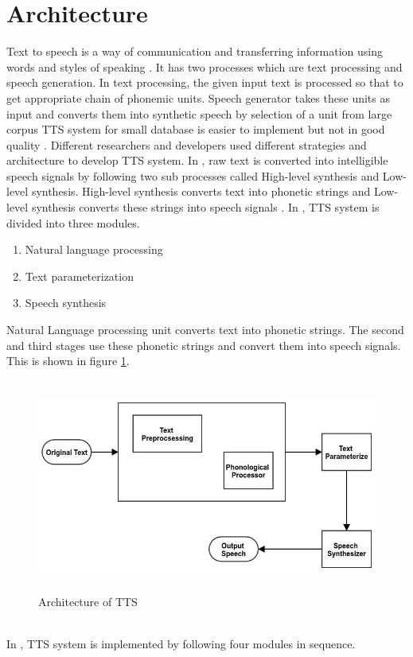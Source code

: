\section{Architecture}
Text to speech is a way of communication and transferring information using words and styles of
speaking \cite{eide2004corpus}. It has two processes which are text processing and speech
generation. In text processing, the given input text is processed so that to get appropriate chain of
phonemic units. Speech generator takes these units as input and converts them into synthetic
speech by selection of a unit from large corpus TTS system for small database is easier to
implement but not in good quality \cite{black2007statistical, zen2007hmm, raj2007text}.
Different researchers and developers used different strategies and architecture to develop TTS system. In \cite{kabir2002natural}, raw text is converted into intelligible speech signals by following two sub processes called High-level synthesis and Low-level synthesis. High-level
synthesis converts text into phonetic strings and Low-level synthesis converts these strings into
speech signals \cite{kabir2002natural}. In \cite{hussain2005phonological}, TTS system is divided into three modules.

\begin{enumerate}
  \item Natural language processing
  \item Text parameterization
  \item Speech synthesis
\end{enumerate}

Natural Language processing unit converts text into phonetic strings. The second and
third stages use these phonetic strings and convert them into speech signals. This is shown in figure \ref{fig:Architecture of TTS}.

\begin{figure}
  \centering
  \includegraphics[width=\linewidth, height=7cm,keepaspectratio]{images/tts_block_dg.jpg}
  \caption{Architecture of TTS}
  \label{fig:Architecture of TTS}
\end{figure}
\\
In \cite{liberman1992text}, TTS system is implemented by following four modules in
sequence.


